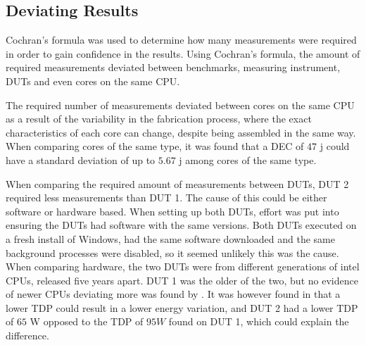 \subsection{Deviating Results}

Cochran's formula was used to determine how many measurements were required in order to gain confidence in the results. Using Cochran's formula, the amount of required measurements deviated between benchmarks, measuring instrument, DUTs and even cores on the same CPU.

The required number of measurements deviated between cores on the same CPU as a result of the variability in the fabrication process, where the exact characteristics of each core can change, despite being assembled in the same way.\cite{Mauzy2020} When comparing cores of the same type, it was found that a DEC of $47$ j could have a standard deviation of up to $5.67$ j among cores of the same type.


When comparing the required amount of measurements between DUTs, DUT 2 required less measurements than DUT 1. The cause of this could be either software or hardware based. When setting up both DUTs, effort was put into ensuring the DUTs had software with the same versions. Both DUTs executed on a fresh install of Windows, had the same software downloaded and the same background processes were disabled, so it seemed unlikely this was the cause. When comparing hardware, the two DUTs were from different generations of intel CPUs, released five years apart. DUT 1 was the older of the two, but no evidence of newer CPUs deviating more was found by \cite{Ournani2020}. It was however found in \cite{Ournani2020} that a lower TDP could result in a lower energy variation, and DUT 2 had a lower TDP of $65$ W opposed to the TDP of $95W$ found on DUT 1, which could explain the difference\cite{IntelComparison}.





